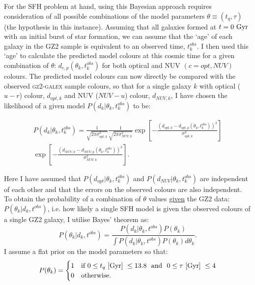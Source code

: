 For the SFH problem at hand, using this Bayesian approach requires consideration of all possible combinations of the model parameters $\theta \equiv (t_{q}, \tau)$ (the hypothesis in this instance). Assuming that all galaxies formed at $t=0~\rm{Gyr}$ with an initial burst of star formation, we can assume that the `age' of each galaxy in the GZ2 sample is equivalent to an observed time, $t^{obs}_{k}$. I then used this  `age' to calculate the predicted model colours at this cosmic time for a given combination of $\theta$: $d_{c,p}(\theta_k, t^{obs}_{k})$ for both optical and NUV $(c={opt,NUV})$ colours. The predicted model colours can now directly be compared with the observed \textsc{gz2-galex} sample colours, so that for a single galaxy $k$ with optical ($u-r$) colour, $d_{opt, k}$ and NUV ($NUV-u$) colour, $d_{NUV,k}$,  I have chosen the likelihood of a given model $P(d_{k}|\theta_k, t^{obs}_{k})$ to be:


\begin{equation}\label{like}
\begin{split}
P(d_{k}|\theta_k, t^{obs}_{k}) = \frac{1}{\sqrt{2\pi\sigma_{opt, k}^2}}\frac{1}{\sqrt{2\pi\sigma_{NUV, k}^2}} \exp{\left[ - \frac{(d_{opt, k} - d_{opt, p}(\theta_k, t_{k}^{obs}))^2}{\sigma_{opt, k}^2} \right]} \\ \exp{\left[ - \frac{(d_{NUV, k} - d_{NUV, p}(\theta_k, t_{k}^{obs}))^2}{\sigma_{NUV, k}^2} \right]}.
\end{split}
\end{equation}


Here I have assumed that $P(d_{opt}|\theta_k, t^{obs}_{k})$ and $P(d_{NUV}|\theta_k, t^{obs}_{k})$ are independent of each other and that the errors on the observed colours are also independent. To obtain the probability of a combination of $\theta$ values \underline{given} the GZ2 data: $P(\theta_k|d_k, t^{obs})$, i.e. how likely a single SFH model is  given the observed colours of a single GZ2 galaxy, I utilise Bayes' theorem as:
 \begin{equation}\label{big}
P(\theta_k|d_k, t^{obs}) = \frac{P(d_k|\theta_k, t^{obs})P(\theta_k)}{\int P(d_k |\theta_k, t^{obs})P(\theta_k) d\theta_k}.
\end{equation}
I assume a flat prior on the model parameters so that:
\begin{equation}\label{prior}
P(\theta_k) =
\begin{cases}
1 & \text{if } 0 \leq t_q ~\rm{[Gyr]}~ \leq 13.8 ~  \text{ and } ~ 0 \leq \tau  ~\rm{[Gyr]}~ \leq 4\\
0 & \text{otherwise.} \\
\end{cases}
\end{equation}

